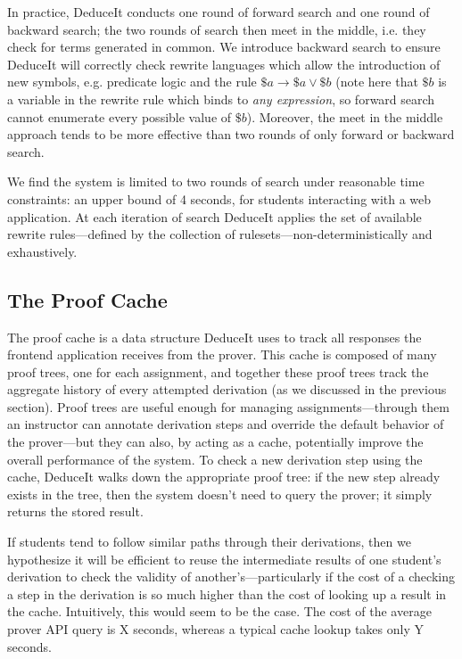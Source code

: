 \documentclass{sigchi}
\begin{document}
In practice, DeduceIt conducts one round of forward search and one round of backward search; the two rounds of search then meet in the middle, i.e. they check for terms generated in common. We introduce backward search to ensure DeduceIt will correctly check rewrite languages which allow the introduction of new symbols, e.g. predicate logic and the rule $\$a \rightarrow \$a \vee \$b$ (note here that $\$b$ is a variable in the rewrite rule which binds to \textit{any expression}, so forward search cannot enumerate every possible value of $\$b$). Moreover, the meet in the middle approach tends to be more effective than two rounds of only forward or backward search. 

We find the system is limited to two rounds of search under reasonable time constraints: an upper bound of 4 seconds, for students interacting with a web application. At each iteration of search DeduceIt applies the set of available rewrite rules---defined by the collection of rulesets---non-deterministically and exhaustively. 

\subsection{The Proof Cache}

The proof cache is a data structure DeduceIt uses to track all responses the frontend application receives from the prover. This cache is composed of many proof trees, one for each assignment, and together these proof trees track the aggregate history of every attempted derivation (as we discussed in the previous section). Proof trees are useful enough for managing assignments---through them an instructor can annotate derivation steps and override the default behavior of the prover---but they can also, by acting as a cache, potentially improve the overall performance of the system. To check a new derivation step using the cache, DeduceIt walks down the appropriate proof tree: if the new step already exists in the tree, then the system doesn't need to query the prover; it simply returns the stored result.

If students tend to follow similar paths through their derivations, then we hypothesize it will be efficient to reuse the intermediate results of one student's derivation to check the validity of another's---particularly if the cost of a checking a step in the derivation is so much higher than the cost of looking up a result in the cache. Intuitively, this would seem to be the case. The cost of the average prover API query is X seconds, whereas a typical cache lookup takes only Y seconds.
\end{document}
